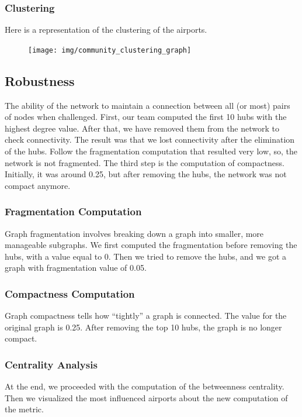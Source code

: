 \documentclass[12pt]{article}
\begin{document}
    \subsubsection{Clustering}
    Here is a representation of the clustering of the airports.

    \begin{figure}[H]
        \centering
        \texttt{[image: img/community\_clustering\_graph]}
    \end{figure}

    \subsection{Robustness}\label{subsec:robustness}
    The ability of the network to maintain a connection between all (or most) pairs of nodes when challenged. First, our team computed the first 10 hubs with the highest degree value. After that, we have removed them from the network to check connectivity. The result was that we lost connectivity after the elimination of the hubs. Follow the fragmentation computation that resulted very low, so, the network is not fragmented. The third step is the computation of compactness. Initially, it was around 0.25, but after removing the hubs, the network was not compact anymore.

    \subsubsection{Fragmentation Computation}
    Graph fragmentation involves breaking down a graph into smaller, more manageable subgraphs. We first computed the fragmentation before removing the hubs, with a value equal to 0. Then we tried to remove the hubs, and we got a graph with fragmentation value of 0.05.

    \subsubsection{Compactness Computation}
    Graph compactness tells how ``tightly'' a graph is connected. The value for the original graph is 0.25. After removing the top 10 hubs, the graph is no longer compact.

    \subsubsection{Centrality Analysis}
    At the end, we proceeded with the computation of the betweenness centrality. Then we visualized the most influenced airports about the new computation of the metric.
\end{document}
